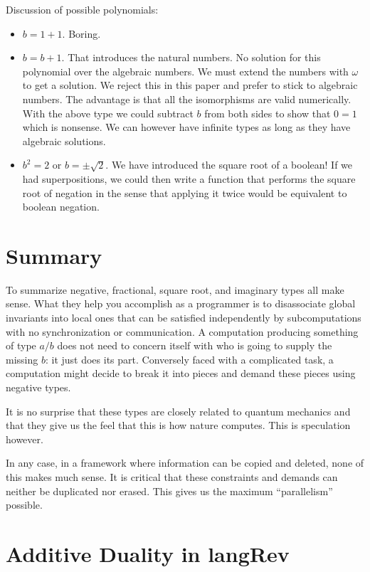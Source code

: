 \documentclass[preprint]{sigplanconf}
\begin{document}
Discussion of possible polynomials:
\begin{itemize}
\item $b=1+1$. Boring.
\item $b=b+1$. That introduces the natural numbers. No solution for this
  polynomial over the algebraic numbers. We must extend the numbers with
  $\omega$ to get a solution. We reject this in this paper and prefer to
  stick to algebraic numbers. The advantage is that all the isomorphisms are
  valid numerically. With the above type we could subtract $b$ from both
  sides to show that $0=1$ which is nonsense. We can however have infinite
  types as long as they have algebraic solutions.
\item $b^2=2$ or $b = \pm \sqrt{2}$. We have introduced the square root of a
  boolean! If we had superpositions, we could then write a function that
  performs the square root of negation in the sense that applying it twice
  would be equivalent to boolean negation.
\end{itemize}

\section{Summary}

To summarize negative, fractional, square root, and imaginary types all make
sense. What they help you accomplish as a programmer is to disassociate
global invariants into local ones that can be satisfied independently by
subcomputations with no synchronization or communication. A computation
producing something of type $a/b$ does not need to concern itself with who is
going to supply the missing $b$: it just does its part. Conversely faced with
a complicated task, a computation might decide to break it into pieces and
demand these pieces using negative types. 

It is no surprise that these types are closely related to quantum mechanics
and that they give us the feel that this is how nature computes. This is
speculation however.

In any case, in a framework where information can be copied and deleted, none
of this makes much sense. It is critical that these constraints and demands
can neither be duplicated nor erased.  This gives us the maximum
``parallelism'' possible.

\section{Additive Duality in {{langRev}} }
\end{document}
